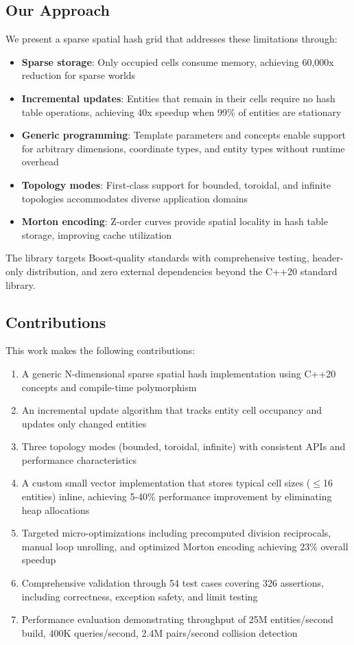 \documentclass[11pt]{article}
\begin{document}
\subsection{Our Approach}

We present a sparse spatial hash grid that addresses these limitations through:

\begin{itemize}
\item \textbf{Sparse storage}: Only occupied cells consume memory, achieving 60,000x reduction for sparse worlds
\item \textbf{Incremental updates}: Entities that remain in their cells require no hash table operations, achieving 40x speedup when 99\% of entities are stationary
\item \textbf{Generic programming}: Template parameters and concepts enable support for arbitrary dimensions, coordinate types, and entity types without runtime overhead
\item \textbf{Topology modes}: First-class support for bounded, toroidal, and infinite topologies accommodates diverse application domains
\item \textbf{Morton encoding}: Z-order curves provide spatial locality in hash table storage, improving cache utilization
\end{itemize}

The library targets Boost-quality standards with comprehensive testing, header-only distribution, and zero external dependencies beyond the C++20 standard library.

\subsection{Contributions}

This work makes the following contributions:

\begin{enumerate}
\item A generic N-dimensional sparse spatial hash implementation using C++20 concepts and compile-time polymorphism
\item An incremental update algorithm that tracks entity cell occupancy and updates only changed entities
\item Three topology modes (bounded, toroidal, infinite) with consistent APIs and performance characteristics
\item A custom small vector implementation that stores typical cell sizes ($\leq$16 entities) inline, achieving 5-40\% performance improvement by eliminating heap allocations
\item Targeted micro-optimizations including precomputed division reciprocals, manual loop unrolling, and optimized Morton encoding achieving 23\% overall speedup
\item Comprehensive validation through 54 test cases covering 326 assertions, including correctness, exception safety, and limit testing
\item Performance evaluation demonstrating throughput of 25M entities/second build, 400K queries/second, 2.4M pairs/second collision detection
\end{enumerate}
\end{document}
